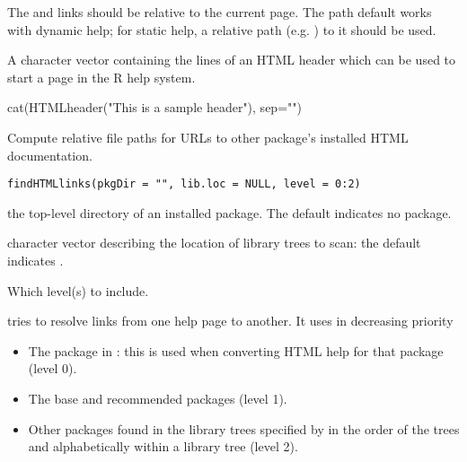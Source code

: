 %
\begin{Details}\relax
The  and  links should be relative to the current page.
The  path default works with dynamic help; for static help, a
relative path (e.g. ) to it should be used.
\end{Details}
%
\begin{Value}
A character vector containing the lines of an HTML header which can be used
to start a page in the R help system.
\end{Value}
%
\begin{Examples}
\begin{ExampleCode}
cat(HTMLheader("This is a sample header"), sep="\n")
\end{ExampleCode}
\end{Examples}
%
\begin{Description}\relax
Compute relative file paths for URLs to other package's installed HTML
documentation.
\end{Description}
%
\begin{Usage}
\begin{verbatim}
findHTMLlinks(pkgDir = "", lib.loc = NULL, level = 0:2)
\end{verbatim}
\end{Usage}
%
\begin{Arguments}
\begin{ldescription}
\item[\code{pkgDir}] the top-level directory of an installed package.  The
default indicates no package.
\item[\code{lib.loc}] character vector describing the location of \R{} library
trees to scan: the default indicates .
\item[\code{level}] Which level(s) to include.
\end{ldescription}
\end{Arguments}
%
\begin{Details}\relax
{} tries to resolve links from one help page to
another.  It uses in decreasing priority
\begin{itemize}

\item The package in : this is used when converting
HTML help for that package (level 0).
\item The base and recommended packages (level 1).
\item Other packages found in the library trees specified by
 in the order of the trees and alphabetically within a
library tree (level 2).

\end{itemize}

\end{Details}

